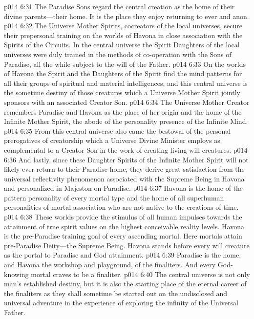 \vs p014 6:31 The Paradise Sons regard the central creation as the home of their divine parents---their home. It is the place they enjoy returning to ever and anon.
\pc \vs p014 6:32 \bibnobreakspace {} The Universe Mother Spirits, cocreators of the local universes, secure their prepersonal training on the worlds of Havona in close association with the Spirits of the Circuits. In the central universe the Spirit Daughters of the local universes were duly trained in the methods of co\hyp{}operation with the Sons of Paradise, all the while subject to the will of the Father.
\vs p014 6:33 On the worlds of Havona the Spirit and the Daughters of the Spirit find the mind patterns for all their groups of spiritual and material intelligences, and this central universe is the sometime destiny of those creatures which a Universe Mother Spirit jointly sponsors with an associated Creator Son.
\vs p014 6:34 The Universe Mother Creator remembers Paradise and Havona as the place of her origin and the home of the Infinite Mother Spirit, the abode of the personality presence of the Infinite Mind.
\vs p014 6:35 From this central universe also came the bestowal of the personal prerogatives of creatorship which a Universe Divine Minister employs as complemental to a Creator Son in the work of creating living will creatures.
\vs p014 6:36 And lastly, since these Daughter Spirits of the Infinite Mother Spirit will not likely ever return to their Paradise home, they derive great satisfaction from the universal reflectivity phenomenon associated with the Supreme Being in Havona and personalized in Majeston on Paradise.
\pc \vs p014 6:37 \bibnobreakspace {} Havona is the home of the pattern personality of every mortal type and the home of all superhuman personalities of mortal association who are not native to the creations of time.
\vs p014 6:38 These worlds provide the stimulus of all human impulses towards the attainment of true spirit values on the highest conceivable reality levels. Havona is the pre\hyp{}Paradise training goal of every ascending mortal. Here mortals attain pre\hyp{}Paradise Deity---the Supreme Being. Havona stands before every will creature as the portal to Paradise and God attainment.
\vs p014 6:39 Paradise is the home, and Havona the workshop and playground, of the finaliters. And every God\hyp{}knowing mortal craves to be a finaliter.
\vs p014 6:40 The central universe is not only man’s established destiny, but it is also the starting place of the eternal career of the finaliters as they shall sometime be started out on the undisclosed and universal adventure in the experience of exploring the infinity of the Universal Father.
